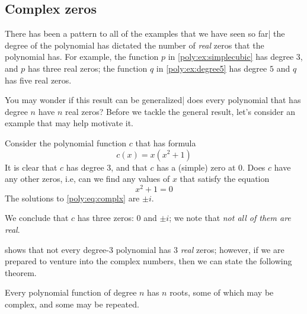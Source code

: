 \subsection*{Complex zeros}
There has been a pattern to all of the examples that we have seen so far|
the degree of the polynomial has dictated the number of \emph{real} zeros that the 
polynomial has. For example, the function $p$ in \cref{poly:ex:simplecubic}
has degree $3$, and $p$ has three real zeros; the function $q$ in \cref{poly:ex:degree5}
has degree $5$ and $q$ has five real zeros.

You may wonder if this result can be generalized| does every polynomial that
has degree $n$ have $n$ real zeros? Before we tackle the general result, 
let's consider an example that may help motivate it.
\begin{pccexample}\label{poly:ex:complx}
	Consider the polynomial function $c$ that has formula
	\[
		c(x)=x(x^2+1)
	\]
	It is clear that $c$ has degree $3$, and that $c$ has a (simple) zero at $0$. Does
	$c$ have any other zeros, i.e, can we find any values of $x$ that satisfy the equation
	\begin{equation}\label{poly:eq:complx}
		x^2+1=0
	\end{equation}
	The solutions to \cref{poly:eq:complx} are $\pm i$.
	
	We conclude that $c$ has three zeros: $0$ and $\pm i$; we note that \emph{not 
	all of them are real}.
\end{pccexample}
 shows that not every degree-$3$ polynomial has $3$
\emph{real} zeros; however, if we are prepared to venture into the complex numbers, 
then we can state the following theorem.
\begin{pccspecialcomment}
	Every polynomial function of degree $n$ has $n$ roots, some of which may 
	be complex, and some may be repeated.
\end{pccspecialcomment}
